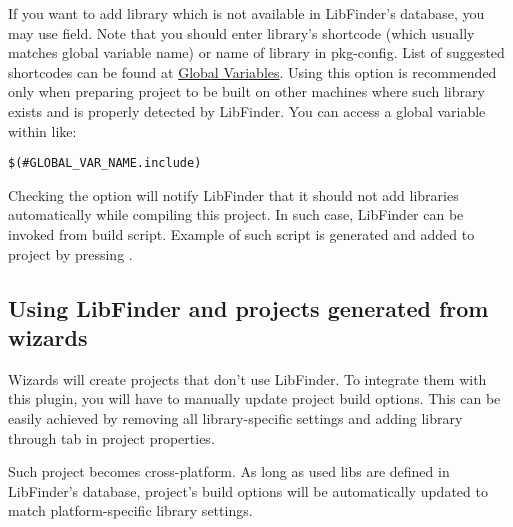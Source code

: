 If you want to add library which is not available in LibFinder's database, you may use  field. Note that you should enter library's shortcode (which usually matches global variable name) or name of library in pkg-config. List of suggested shortcodes can be found at \href{http://wiki.codeblocks.org/index.php?title=Recommended_global_variables}{Global Variables}. Using this option is recommended only when preparing project to be built on other machines where such library exists and is properly detected by LibFinder. You can access a global variable within \codeblocks like:

\begin{lstlisting}
$(#GLOBAL_VAR_NAME.include)
\end{lstlisting}

Checking the  option will notify LibFinder that it should not add libraries automatically while compiling this project. In such case, LibFinder can be invoked from build script. Example of such script is generated and added to project by pressing .

\subsection{Using LibFinder and projects generated from wizards}

Wizards will create projects that don't use LibFinder. To integrate them with this plugin, you will have to manually update project build options. This can be easily achieved by removing all library-specific settings and adding library through  tab in project properties.

Such project becomes cross-platform. As long as used libs are defined in LibFinder's database, project's build options will be automatically updated to match platform-specific library settings.


